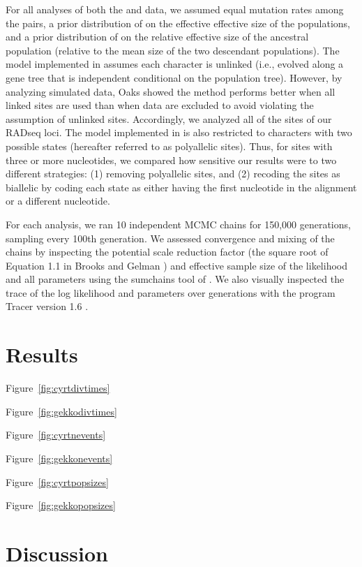 For all analyses of both the  and  data, we
assumed equal mutation rates among the pairs, a prior distribution of
 on the effective effective size of the populations, and a
prior distribution of  on the relative effective size of the
ancestral population (relative to the mean size of the two descendant
populations).
The model implemented in \ecoevolity assumes each character is unlinked (i.e.,
evolved along a gene tree that is independent conditional on the population
tree).
However, by analyzing simulated data, Oaks \citeyear{Oaks2018ecoevolity} showed
the method performs better when all linked sites are used than when data are
excluded to avoid violating the assumption of unlinked sites.
Accordingly, we analyzed all of the sites of our RADseq loci.
The model implemented in \ecoevolity is also restricted to characters with two
possible states (hereafter referred to as polyallelic sites).
Thus, for sites with three or more nucleotides, we compared how sensitive our results were to two different strategies:
(1) removing polyallelic sites, and
(2) recoding the sites as biallelic by coding each state as either having the
first nucleotide in the alignment or a different nucleotide.

For each analysis, we ran 10 independent MCMC chains for 150,000 generations,
sampling every 100th generation.
We assessed convergence and mixing of the chains by inspecting the potential scale
reduction factor (the square root of Equation 1.1 in Brooks and Gelman
\citeyear{Brooks1998}) and effective sample size \citep{Gong2014} of the
likelihood and all parameters using the sumchains tool of \pycoevolity.
We also visually inspected the trace of the log likelihood and parameters over
generations with the program Tracer version 1.6 \citep{Tracer16}.


\section{Results}

Figure~\ref{fig:cyrtdivtimes}

Figure~\ref{fig:gekkodivtimes}

Figure~\ref{fig:cyrtnevents}

Figure~\ref{fig:gekkonevents}

Figure~\ref{fig:cyrtpopsizes}

Figure~\ref{fig:gekkopopsizes}

\section{Discussion}
